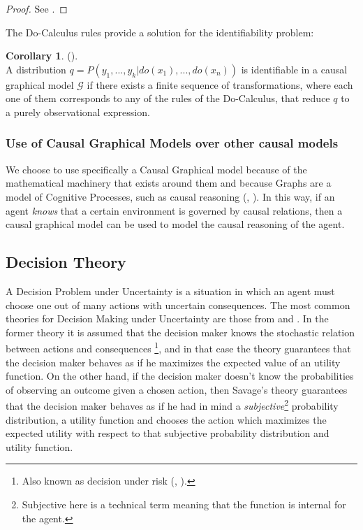 \documentclass[english,letterpaper,12pt,final]{article}
\theoremstyle{definition}
\newtheorem{cor}{Corollary}[section]
\begin{document}
\begin{proof}
See \cite{peters2017elements}.
\end{proof}
The Do-Calculus rules provide a solution for the identifiability problem:
\begin{cor} (\cite{pearl2009causality}).\\
A distribution $q=P(y_1,...,y_k | do(x_1),...,do(x_n))$ is identifiable in a causal graphical model $\mathcal{G}$ if there exists a finite sequence of transformations, where each one of them corresponds to any of the rules of the Do-Calculus, that reduce $q$ to a purely observational expression.
\end{cor}

\subsubsection{Use of Causal Graphical Models over other causal models}
We choose to use specifically a Causal Graphical model because of the mathematical machinery that exists around them and because Graphs are a model of Cognitive Processes, such as causal reasoning (\cite{glymour2003learning}, \cite{danks2014unifying}). In this way, if an agent \textit{knows} that a certain environment is governed by causal relations, then a causal graphical model can be used to model the causal reasoning of the agent. 
	
	\subsection{Decision Theory}
	A Decision Problem under Uncertainty is a situation in which an agent must choose one out of many actions with uncertain consequences. The most common theories for Decision Making under Uncertainty are those from \cite{von1944theory} and \cite{savage1954the}. In the former theory it is assumed that the decision maker knows the stochastic relation between actions and consequences \footnote{Also known as decision under risk (\cite{binmore2008rational}, \cite{peterson2017introduction}).}, and in that case the theory guarantees that the decision maker behaves as if he maximizes the expected value of an utility function. On the other hand, if the decision maker doesn't know the probabilities of observing an outcome given a chosen action, then Savage's theory guarantees that the decision maker behaves as if he had in mind a \textit{subjective}\footnote{Subjective here is a technical term meaning that the function is internal for the agent.} probability distribution, a utility function and chooses the action which maximizes the expected utility with respect to that subjective probability distribution and utility function. 
	
\end{document}
